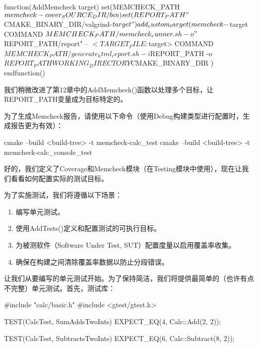 \begin{cmake}
function(AddMemcheck target)
    set(MEMCHECK_PATH ${memcheck-cover_SOURCE_DIR}/bin)
    set(REPORT_PATH "${CMAKE_BINARY_DIR}/valgrind-${target}")
    add_custom_target(memcheck-${target}
        COMMAND ${MEMCHECK_PATH}/memcheck_runner.sh -o
            "${REPORT_PATH}/report"
            -- $<TARGET_FILE:${target}>
        COMMAND ${MEMCHECK_PATH}/generate_html_report.sh
            -i ${REPORT_PATH}
            -o ${REPORT_PATH}
        WORKING_DIRECTORY ${CMAKE_BINARY_DIR}
    )
endfunction()
\end{cmake}

我们稍微改进了第12章中的AddMemcheck()函数以处理多个目标，让REPORT\_PATH变量成为目标特定的。

为了生成Memcheck报告，请使用以下命令（使用Debug构建类型进行配置时，生成报告更为有效）：

\begin{shell}
cmake --build <build-tree> -t memcheck-calc_test
cmake --build <build-tree> -t memcheck-calc_console_test
\end{shell}

好的，我们定义了Coverage和Memcheck模块（在Testing模块中使用），现在让我们看看如何配置实际的测试目标。


为了实施测试，我们将遵循以下场景：

\begin{enumerate}
\item
编写单元测试。

\item
使用AddTests()定义和配置测试的可执行目标。

\item
为被测软件（Software Under Test, SUT）配置度量以启用覆盖率收集。

\item
确保在构建之间清除覆盖率数据以防止分段错误。
\end{enumerate}

让我们从要编写的单元测试开始。为了保持简洁，我们将提供最简单的（也许有点不完整）单元测试。首先，测试库：


\begin{cmake}
#include "calc/basic.h"
#include <gtest/gtest.h>

TEST(CalcTest, SumAddsTwoInts) {
    EXPECT_EQ(4, Calc::Add(2, 2));
}

TEST(CalcTest, SubtractsTwoInts) {
    EXPECT_EQ(6, Calc::Subtract(8, 2));
}
\end{cmake}

